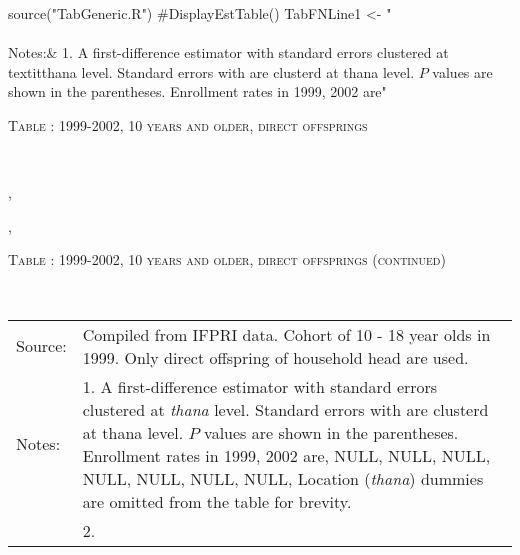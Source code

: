 \begin{Schunk}
\begin{Sinput}
source("TabGeneric.R")
#DisplayEstTable()
TabFNLine1 <- "\\\\[-1ex] Notes:& 1. A first-difference estimator with standard errors clustered at \\textit{thana} level. Standard errors with are clusterd at thana level. $P$ values are shown in the parentheses. Enrollment rates in 1999, 2002 are"
\end{Sinput}
\end{Schunk}
\begin{table}\hfil\textsc{\footnotesize Table \thetable: 1999-2002, 10 years and older, direct offsprings\label{zEm.1999.10.sameN}}\\\setlength{\tabcolsep}{1pt}\renewcommand{\arraystretch}{.675}\hspace{-2em}\hfil{}\\\renewcommand{\arraystretch}{1}\end{table}, \addtocounter{table}{-1}, \begin{table}\hfil\textsc{\footnotesize Table \thetable: 1999-2002, 10 years and older, direct offsprings (continued)\label{zEm.1999.10.sameN}}\\\setlength{\tabcolsep}{1pt}\renewcommand{\arraystretch}{.675}\hspace{-2em}\hfil{}\\\renewcommand{\arraystretch}{1}\hfil\begin{tabular}{>{\hfill\scriptsize}p{1cm}<{}>{\scriptsize}p{12cm}<{\hfill}} Source:& Compiled from IFPRI data. Cohort of 10 - 18 year olds in 1999. Only direct offspring of household head are used.\\[-1ex] Notes:& 1. A first-difference estimator with standard errors clustered at \textit{thana} level. Standard errors with are clusterd at thana level. $P$ values are shown in the parentheses. Enrollment rates in 1999, 2002 are, NULL, NULL, NULL, NULL, NULL, NULL, NULL, Location (\textit{thana}) dummies are omitted from the table for brevity. \\ & 2.   \end{tabular} \end{table}
